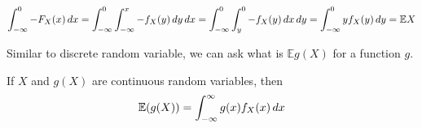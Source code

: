\documentclass{huhtakm-template-book}
\newcommand{\expect}{\mathbb{E}}
\begin{document}
    \begin{proofing}
        \begin{equation*}
            \intlu{-\infty}{0}-F_{X}(x)\,dx=\intlu{-\infty}{0}\intlu{-\infty}{x}-f_{X}(y)\,dy\,dx=\intlu{-\infty}{0}\intlu{y}{0}-f_{X}(y)\,dx\,dy=\intlu{-\infty}{0}yf_{X}(y)\,dy=\expect X
        \end{equation*}
    \end{proofing}
    Similar to discrete random variable, we can ask what is $\expect g(X)$ for a function $g$.
    \begin{thm}
        \label{expectation of function of continuous random variable}
        If $X$ and $g(X)$ are continuous random variables, then
        \begin{equation*}
            \expect(g(X))=\intinfty g(x)f_{X}(x)\,dx
        \end{equation*}
    \end{thm}
\end{document}
